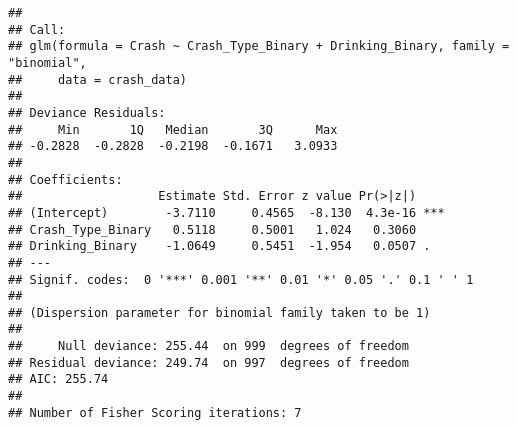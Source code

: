 \documentclass[
]{article}
\newenvironment{Shaded}{\begin{snugshade}}{\end{snugshade}}
\newcommand{\AttributeTok}[1]{\textcolor[rgb]{0.77,0.63,0.00}{#1}}
\newcommand{\CommentTok}[1]{\textcolor[rgb]{0.56,0.35,0.01}{\textit{#1}}}
\newcommand{\DecValTok}[1]{\textcolor[rgb]{0.00,0.00,0.81}{#1}}
\newcommand{\FunctionTok}[1]{\textcolor[rgb]{0.00,0.00,0.00}{#1}}
\newcommand{\NormalTok}[1]{#1}
\newcommand{\OtherTok}[1]{\textcolor[rgb]{0.56,0.35,0.01}{#1}}
\newcommand{\SpecialCharTok}[1]{\textcolor[rgb]{0.00,0.00,0.00}{#1}}
\newcommand{\StringTok}[1]{\textcolor[rgb]{0.31,0.60,0.02}{#1}}
\begin{document}
\begin{Shaded}
\end{Shaded}

\begin{verbatim}
## 
## Call:
## glm(formula = Crash ~ Crash_Type_Binary + Drinking_Binary, family = "binomial", 
##     data = crash_data)
## 
## Deviance Residuals: 
##     Min       1Q   Median       3Q      Max  
## -0.2828  -0.2828  -0.2198  -0.1671   3.0933  
## 
## Coefficients:
##                   Estimate Std. Error z value Pr(>|z|)    
## (Intercept)        -3.7110     0.4565  -8.130  4.3e-16 ***
## Crash_Type_Binary   0.5118     0.5001   1.024   0.3060    
## Drinking_Binary    -1.0649     0.5451  -1.954   0.0507 .  
## ---
## Signif. codes:  0 '***' 0.001 '**' 0.01 '*' 0.05 '.' 0.1 ' ' 1
## 
## (Dispersion parameter for binomial family taken to be 1)
## 
##     Null deviance: 255.44  on 999  degrees of freedom
## Residual deviance: 249.74  on 997  degrees of freedom
## AIC: 255.74
## 
## Number of Fisher Scoring iterations: 7
\end{verbatim}
\end{document}
